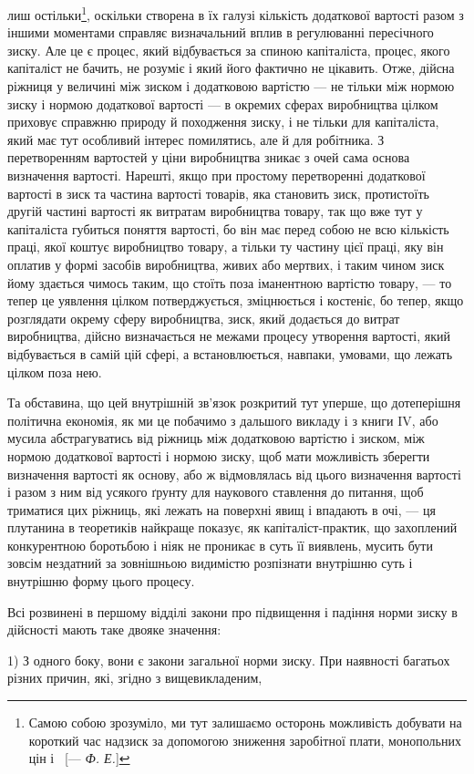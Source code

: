 \parcont{}  %
лиш остільки\footnote{
Самою собою зрозуміло, ми тут залишаємо осторонь можливість добувати
на короткий час надзиск за допомогою зниження заробітної плати, монопольних
цін і~ [— \emph{Ф. Е.}]
}, оскільки створена в їх галузі кількість додаткової вартості разом з іншими моментами
справляє визначальний вплив в регулюванні пересічного зиску. Але це є процес, який відбувається за
спиною капіталіста, процес, якого капіталіст
не бачить, не розуміє і який його фактично не цікавить. Отже,
дійсна ріжниця у величині між зиском і додатковою вартістю — не тільки між нормою зиску і нормою
додаткової вартості — в окремих сферах виробництва цілком приховує справжню природу й походження
зиску, і не тільки для капіталіста, який має
тут особливий інтерес помилятись, але й для робітника. З перетворенням вартостей у ціни виробництва
зникає з очей сама
основа визначення вартості. Нарешті, якщо при простому перетворенні додаткової вартості в зиск та
частина вартості товарів, яка становить зиск, протистоїть другій частині вартості як
витратам виробництва товару, так що вже тут у капіталіста
губиться поняття вартості, бо він має перед собою не всю кількість праці, якої коштує виробництво
товару, а тільки ту частину
цієї праці, яку він оплатив у формі засобів виробництва, живих
або мертвих, і таким чином зиск йому здається чимось таким,
що стоїть поза іманентною вартістю товару, — то тепер це
уявлення цілком потверджується, зміцнюється і костеніє, бо
тепер, якщо розглядати окрему сферу виробництва, зиск, який
додається до витрат виробництва, дійсно визначається не межами процесу утворення вартості, який
відбувається в самій
цій сфері, а встановлюється, навпаки, умовами, що лежать цілком поза нею.

Та обставина, що цей внутрішній зв’язок розкритий тут
уперше, що дотеперішня політична економія, як ми це побачимо
з дальшого викладу і з книги IV, або мусила абстрагуватись
від ріжниць між додатковою вартістю і зиском, між нормою
додаткової вартості і нормою зиску, щоб мати можливість зберегти визначення вартості як основу, або
ж відмовлялась від
цього визначення вартості і разом з ним від усякого ґрунту
для наукового ставлення до питання, щоб триматися цих ріжниць, які лежать на поверхні явищ і
впадають в очі, — ця плутанина в теоретиків найкраще показує, як капіталіст-практик, що
захоплений конкурентною боротьбою і ніяк не проникає в суть
її виявлень, мусить бути зовсім нездатний за зовнішньою видимістю розпізнати внутрішню суть і
внутрішню форму цього процесу.

Всі розвинені в першому відділі закони про підвищення
і падіння норми зиску в дійсності мають таке двояке значення:

1) З одного боку, вони є закони загальної норми зиску. При
наявності багатьох різних причин, які, згідно з вищевикладеним,
\parbreak{}  %

